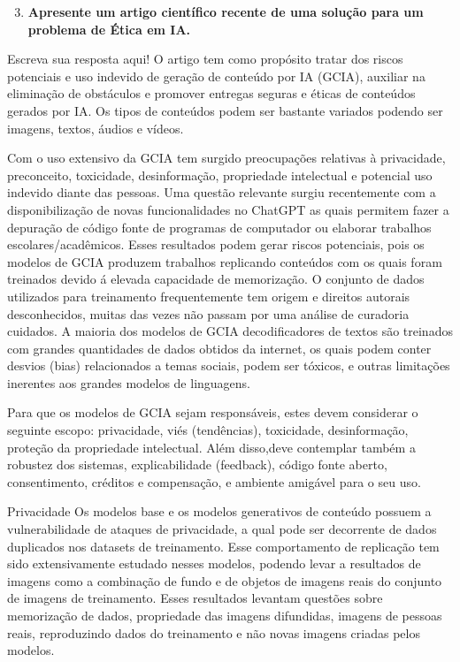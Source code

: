 \begin{enumerate}\setcounter{enumi}{2}\bfseries
    \item  \textbf{Apresente um artigo científico recente de uma solução para um problema de Ética em IA.}
\end{enumerate}

Escreva sua resposta aqui!
O artigo \cite{chen_fu_lyu} tem como propósito tratar dos riscos potenciais e uso indevido de geração de conteúdo 
por IA (GCIA), 
auxiliar na eliminação de obstáculos e promover entregas seguras e éticas de conteúdos gerados por IA. 
Os tipos de conteúdos podem ser bastante variados podendo ser imagens, textos, áudios e vídeos. 


Com o uso extensivo da GCIA tem surgido preocupações relativas à privacidade, preconceito, toxicidade, desinformação, 
propriedade intelectual e potencial uso indevido diante das pessoas. Uma questão relevante surgiu recentemente com a 
disponibilização de novas funcionalidades no ChatGPT as quais permitem fazer a depuração de código fonte de programas de 
computador ou elaborar trabalhos escolares/acadêmicos. Esses resultados podem gerar riscos potenciais, pois os modelos 
de GCIA produzem trabalhos replicando conteúdos com os quais foram treinados devido á elevada capacidade de memorização.
O conjunto de dados utilizados para 
treinamento frequentemente tem origem e direitos autorais desconhecidos, muitas das vezes não passam por uma análise 
de curadoria cuidados. A maioria dos modelos de GCIA decodificadores de textos são treinados com grandes quantidades 
de dados obtidos da internet, os quais podem conter desvios (bias) relacionados a temas sociais, podem ser tóxicos, 
e outras limitações inerentes aos grandes modelos de linguagens.

Para que os modelos de GCIA sejam responsáveis, estes devem considerar o seguinte escopo: 
privacidade, viés (tendências), toxicidade, desinformação, proteção da propriedade intelectual. 
Além disso,deve contemplar também a robustez dos sistemas, explicabilidade (feedback),
código fonte aberto, consentimento, créditos e compensação, e ambiente amigável para o seu uso.


Privacidade
Os modelos base e os modelos generativos de conteúdo possuem a vulnerabilidade de ataques de privacidade, a qual pode  
ser decorrente de dados duplicados nos datasets de treinamento. Esse comportamento de replicação tem sido 
extensivamente estudado nesses modelos, podendo levar a resultados de imagens como a combinação de fundo e de objetos  
de imagens reais do conjunto de imagens de treinamento. Esses resultados levantam questões sobre 
memorização de dados, propriedade das imagens difundidas, imagens de 
pessoas reais, reproduzindo dados do treinamento e não novas imagens criadas pelos modelos.

